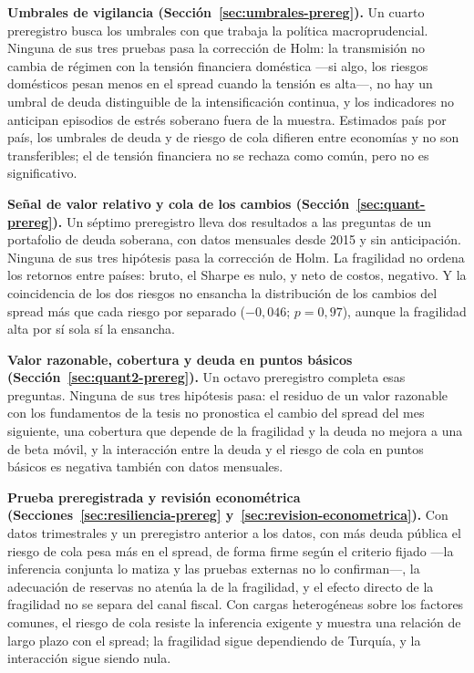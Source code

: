 \textbf{Umbrales de vigilancia (Sección~\ref{sec:umbrales-prereg}).} Un cuarto preregistro busca los umbrales con que trabaja la política macroprudencial. Ninguna de sus tres pruebas pasa la corrección de Holm: la transmisión no cambia de régimen con la tensión financiera doméstica ---si algo, los riesgos domésticos pesan menos en el spread cuando la tensión es alta---, no hay un umbral de deuda distinguible de la intensificación continua, y los indicadores no anticipan episodios de estrés soberano fuera de la muestra. Estimados país por país, los umbrales de deuda y de riesgo de cola difieren entre economías y no son transferibles; el de tensión financiera no se rechaza como común, pero no es significativo.

\textbf{Señal de valor relativo y cola de los cambios (Sección~\ref{sec:quant-prereg}).} Un séptimo preregistro lleva dos resultados a las preguntas de un portafolio de deuda soberana, con datos mensuales desde 2015 y sin anticipación. Ninguna de sus tres hipótesis pasa la corrección de Holm. La fragilidad no ordena los retornos entre países: bruto, el Sharpe es nulo, y neto de costos, negativo. Y la coincidencia de los dos riesgos no ensancha la distribución de los cambios del spread más que cada riesgo por separado ($-0{,}046$; $p=0{,}97$), aunque la fragilidad alta por sí sola sí la ensancha.

\textbf{Valor razonable, cobertura y deuda en puntos básicos (Sección~\ref{sec:quant2-prereg}).} Un octavo preregistro completa esas preguntas. Ninguna de sus tres hipótesis pasa: el residuo de un valor razonable con los fundamentos de la tesis no pronostica el cambio del spread del mes siguiente, una cobertura que depende de la fragilidad y la deuda no mejora a una de beta móvil, y la interacción entre la deuda y el riesgo de cola en puntos básicos es negativa también con datos mensuales.

\textbf{Prueba preregistrada y revisión econométrica (Secciones~\ref{sec:resiliencia-prereg} y~\ref{sec:revision-econometrica}).} Con datos trimestrales y un preregistro anterior a los datos, con más deuda pública el riesgo de cola pesa más en el spread, de forma firme según el criterio fijado ---la inferencia conjunta lo matiza y las pruebas externas no lo confirman---, la adecuación de reservas no atenúa la de la fragilidad, y el efecto directo de la fragilidad no se separa del canal fiscal. Con cargas heterogéneas sobre los factores comunes, el riesgo de cola resiste la inferencia exigente y muestra una relación de largo plazo con el spread; la fragilidad sigue dependiendo de Turquía, y la interacción sigue siendo nula.

